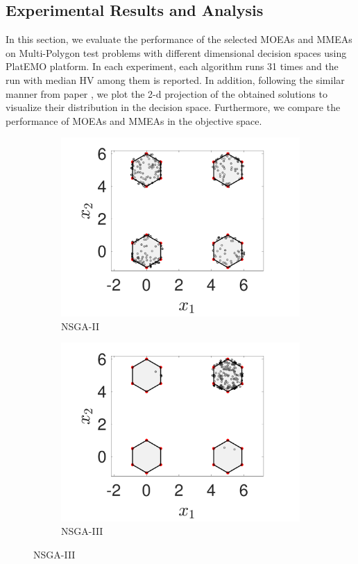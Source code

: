 \documentclass[conference]{IEEEtran}
\begin{document}
\subsection{Experimental Results and Analysis}
\label{Experimental Results}
In this section, we evaluate the performance of the selected MOEAs and MMEAs on Multi-Polygon test problems with different dimensional decision spaces using PlatEMO platform\cite{tian2017platemo}. In each experiment, each algorithm runs 31 times and the run with median HV among them is reported. In addition, following the similar manner from paper \cite{ishibuchi2019salable}, we plot the 2-d projection of the obtained solutions to visualize their distribution in the decision space. Furthermore, we compare the performance of MOEAs and MMEAs in the objective space.
\begin{figure}[htbp]
    \centering
    \begin{subfigure}[b]{.24\textwidth}
    \includegraphics[width=\linewidth]{Section5/dim2/PS/NSGAII}
    \caption{NSGA-II}
    \end{subfigure}
    \begin{subfigure}[b]{.24\textwidth}
    \includegraphics[width=\linewidth]{Section5/dim2/PS/NSGAIII}
    \caption{NSGA-III}
    \end{subfigure}
    

\end{figure}
\end{document}
